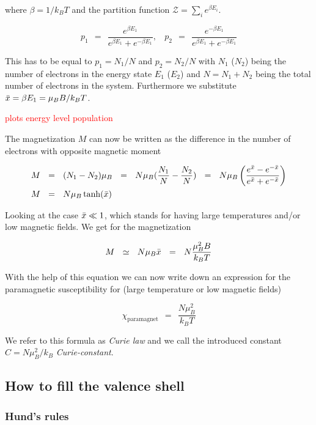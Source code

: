 \documentclass[10pt]{report}
\numberwithin{equation}{chapter}
\begin{document}
where $\beta = 1/k_BT$ and the partition function $\mathcal{Z} = \sum_i e^{\beta E_i}$. 


\begin{equation}
  p_1 ~~=~~ \frac{e^{ \beta E_1}}{e^{\beta E_1} + e^{-\beta E_1}}, ~~~~ 
  p_2 ~~=~~ \frac{e^{-\beta E_1}}{e^{\beta E_1} + e^{-\beta E_1}}
\end{equation}

This has to be equal to $p_1 = N_1/N$ and $p_2 = N_2/N$ with $N_1$ ($N_2$) being the number of electrons in the energy state $E_1$ ($E_2$) and $N = N_1 + N_2$ being the total number of electrons in the system. Furthermore we substitute $\Bar{x} = \beta E_1 = \mu_B B/k_B T$.

\textcolor{red}{plots energy level population}


The magnetization $M$ can now be written as the difference in the number of electrons with opposite magnetic moment

\begin{align}
  M ~~& =~~ (N_1 - N_2) \mu_B ~~=~~ N \mu_B (\frac{N_1}{N} - \frac{N_2}{N}) ~~=~~ 
  N \mu_B \left( \frac{e^{\Bar{x}} - e^{-\Bar{x}}}{e^{\Bar{x}} + e^{-\Bar{x}}} \right) \nonumber \\
  M ~~& =~~ N \mu_B \tanh(\Bar{x})
\end{align}


Looking at the case $\Bar{x} \ll 1$, which stands for having large temperatures and/or low magnetic fields. We get for the magnetization

\begin{equation}
  M ~~\simeq~~ N \mu_B \Bar{x} ~~=~~ N \frac{\mu_B^2 B}{k_B T}
\end{equation}

With the help of this equation we can now write down an expression for the paramagnetic susceptibility for (large temperature or low magnetic fields)

\begin{equation}
  \chi_\text{paramagnet} ~~=~~ \frac{N \mu_B^2}{k_B T} 
\end{equation}

We refer to this formula as \textit{Curie law} and we call the introduced constant $C = N \mu_B^2/k_B$ \textit{Curie-constant}.


\subsection{How to fill the valence shell}

\subsubsection{Hund's rules}
\end{document}
